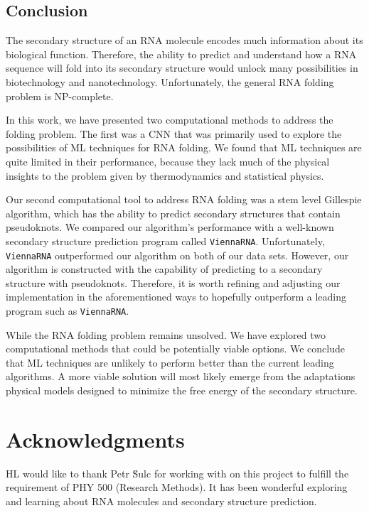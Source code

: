 \documentclass[11pt]{article}
\begin{document}
\begin{multicols}{2}
\section{Conclusion}
The secondary structure of an RNA molecule encodes much information about its biological function. Therefore, the ability to predict and understand how a RNA sequence will fold into its secondary structure would unlock many possibilities in biotechnology and nanotechnology. Unfortunately, the general RNA folding problem is NP-complete. 

In this work, we have presented two computational methods to address the folding problem. The first was a CNN that was primarily used to explore the possibilities of ML techniques for RNA folding. We found that ML techniques are quite limited in their performance, because they lack much of the physical insights to the problem given by thermodynamics and statistical physics. 

Our second computational tool to address RNA folding was a stem level Gillespie algorithm, which has the ability to predict secondary structures that contain pseudoknots. We compared our algorithm's performance with a well-known secondary structure prediction program called \texttt{ViennaRNA}. Unfortunately, \texttt{ViennaRNA} outperformed our algorithm on both of our data sets. However, our algorithm is constructed with the capability of predicting to a secondary structure with pseudoknots. Therefore, it is worth refining and adjusting our implementation in the aforementioned ways to hopefully outperform a leading program such as \texttt{ViennaRNA}.

While the RNA folding problem remains unsolved. We have explored two computational methods that could be potentially viable options. We conclude that ML techniques are unlikely to perform better than the current leading algorithms. A more viable solution will most likely emerge from the adaptations physical models designed to minimize the free energy of the secondary structure. 
\end{multicols}

\section*{Acknowledgments}
HL would like to thank Petr \u Sulc for working with on this project to fulfill the requirement of PHY 500 (Research Methods). It has been wonderful exploring and learning about RNA molecules and secondary structure prediction.
\newpage

\nocite{*}
\printbibliography
\end{document}
